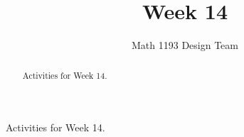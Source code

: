 \documentclass[noauthor]{ximera}
\title{Week 14}
\author{Math 1193 Design Team}
\begin{document}
\begin{abstract}
    Activities for Week 14.
\end{abstract}
\maketitle

Activities for Week 14.
\end{document}
